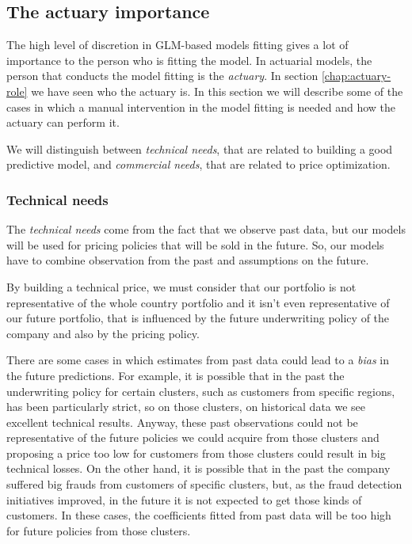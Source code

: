 \documentclass[a4paper, nobind]{templates/ociamthesis}
\theoremstyle{definition}
\theoremstyle{definition}
\theoremstyle{definition}
\theoremstyle{remark}
\begin{document}
\hypertarget{chap:actuary-importance}{%
\subsection{The actuary importance}\label{chap:actuary-importance}}

The high level of discretion in GLM-based models fitting gives a lot of importance to the person who is fitting the model. In actuarial models, the person that conducts the model fitting is the \emph{actuary}. In section \ref{chap:actuary-role} we have seen who the actuary is. In this section we will describe some of the cases in which a manual intervention in the model fitting is needed and how the actuary can perform it.

We will distinguish between \emph{technical needs}, that are related to building a good predictive model, and \emph{commercial needs}, that are related to price optimization.

\hypertarget{technical-needs}{%
\subsubsection{Technical needs}\label{technical-needs}}

The \emph{technical needs} come from the fact that we observe past data, but our models will be used for pricing policies that will be sold in the future. So, our models have to combine observation from the past and assumptions on the future.

By building a technical price, we must consider that our portfolio is not representative of the whole country portfolio and it isn't even representative of our future portfolio, that is influenced by the future underwriting policy of the company and also by the pricing policy.

There are some cases in which estimates from past data could lead to a \emph{bias} in the future predictions. For example, it is possible that in the past the underwriting policy for certain clusters, such as customers from specific regions, has been particularly strict, so on those clusters, on historical data we see excellent technical results. Anyway, these past observations could not be representative of the future policies we could acquire from those clusters and proposing a price too low for customers from those clusters could result in big technical losses. On the other hand, it is possible that in the past the company suffered big frauds from customers of specific clusters, but, as the fraud detection initiatives improved, in the future it is not expected to get those kinds of customers. In these cases, the coefficients fitted from past data will be too high for future policies from those clusters.
\end{document}

